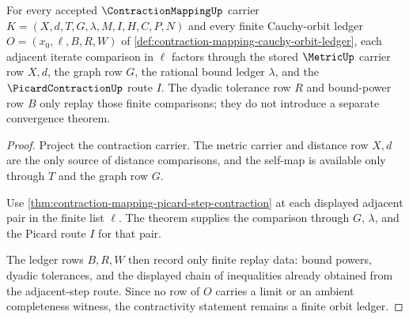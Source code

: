 \begin{theorem}
\label{thm:contraction-mapping-cauchy-orbit-contractivity}
For every accepted $\ContractionMappingUp$ carrier $K=(X,d,T,G,\lambda,M,I,H,C,P,N)$ and every finite Cauchy-orbit ledger $O=(x_0,\ell,B,R,W)$ of \autoref{def:contraction-mapping-cauchy-orbit-ledger}, each adjacent iterate comparison in $\ell$ factors through the stored $\MetricUp$ carrier row $X,d$, the graph row $G$, the rational bound ledger $\lambda$, and the $\PicardContractionUp$ route $I$. The dyadic tolerance row $R$ and bound-power row $B$ only replay those finite comparisons; they do not introduce a separate convergence theorem.
\end{theorem}
\begin{proof}
Project the contraction carrier. The metric carrier and distance row $X,d$ are the only source of distance comparisons, and the self-map is available only through $T$ and the graph row $G$.

Use \autoref{thm:contraction-mapping-picard-step-contraction} at each displayed adjacent pair in the finite list $\ell$. The theorem supplies the comparison through $G$, $\lambda$, and the Picard route $I$ for that pair.

The ledger rows $B,R,W$ then record only finite replay data: bound powers, dyadic tolerances, and the displayed chain of inequalities already obtained from the adjacent-step route. Since no row of $O$ carries a limit or an ambient completeness witness, the contractivity statement remains a finite orbit ledger.
\end{proof}

